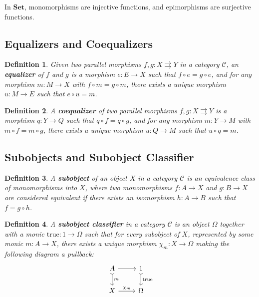 \documentclass{article}
\newtheorem{definition}{Definition}[section]
\begin{document}
In $\mathbf{Set}$, monomorphisms are injective functions, and epimorphisms are surjective functions.

\subsection{Equalizers and Coequalizers}

\begin{definition}
    Given two parallel morphisms $f, g \colon X \rightrightarrows Y$ in a category $\mathcal{C}$, an \textbf{equalizer} of $f$ and $g$ is a morphism $e \colon E \to X$ such that $f \circ e = g \circ e$, and for any morphism $m \colon M \to X$ with $f \circ m = g \circ m$, there exists a unique morphism $u \colon M \to E$ such that $e \circ u = m$.
\end{definition}

\begin{definition}
    A \textbf{coequalizer} of two parallel morphisms $f, g \colon X \rightrightarrows Y$ is a morphism $q \colon Y \to Q$ such that $q \circ f = q \circ g$, and for any morphism $m \colon Y \to M$ with $m \circ f = m \circ g$, there exists a unique morphism $u \colon Q \to M$ such that $u \circ q = m$.
\end{definition}

\subsection{Subobjects and Subobject Classifier}

\begin{definition}
    A \textbf{subobject} of an object $X$ in a category $\mathcal{C}$ is an equivalence class of monomorphisms into $X$, where two monomorphisms $f \colon A \to X$ and $g \colon B \to X$ are considered equivalent if there exists an isomorphism $h \colon A \to B$ such that $f = g \circ h$.
\end{definition}

\begin{definition}
    A \textbf{subobject classifier} in a category $\mathcal{C}$ is an object $\Omega$ together with a monic $\text{true} \colon 1 \to \Omega$ such that for every subobject of $X$, represented by some monic $m \colon A \to X$, there exists a unique morphism $\chi_m \colon X \to \Omega$ making the following diagram a pullback:
    \[
        \begin{tikzcd}
            A \arrow[r] \arrow[d, tail, "m"] & 1 \arrow[d, tail, "\text{true}"] \\
            X \arrow[r, "\chi_m"] & \Omega
        \end{tikzcd}
    \]
\end{definition}
\end{document}
